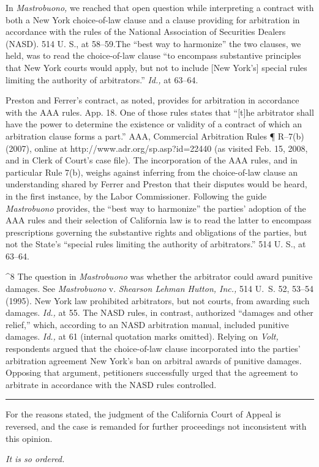   In \emph{Mastrobuono,} we reached that open question while interpreting
a contract with both a New York choice-of-law clause and a clause
providing for arbitration in accordance with the rules of the
National Association of Securities Dealers (NASD). 514 U. S., at
58--59.\footnotemark[8] The ``best way to harmonize'' the two clauses, we
held, was to read the choice-of-law clause ``to encompass substantive
principles that New York courts would apply, but not to include [New
York's] special rules limiting the authority of arbitrators.''
\emph{Id.,} at 63--64.

  Preston and Ferrer's contract, as noted, provides for arbitration
in accordance with the AAA rules. App. 18. One of those rules
states that ``[t]he arbitrator shall have the power to determine the
existence or validity of a contract of which an arbitration clause forms
a part.'' AAA, Commercial Arbitration Rules ¶ R--7(b) (2007),
online at http://www.adr.org/sp.asp?id=22440 (as visited Feb. 15, 2008,
and in Clerk of Court's case file). The incorporation of the AAA
rules, and in particular Rule 7(b), weighs against inferring from the
choice-of-law clause an understanding shared by Ferrer and Preston that
their disputes would be heard, in \newpage  the first instance, by the
Labor Commissioner. Following the guide \emph{Mastrobuono} provides, the
``best way to harmonize'' the parties' adoption of the AAA rules and
their selection of California law is to read the latter to encompass
prescriptions governing the substantive rights and obligations of the
parties, but not the State's ``special rules limiting the authority
of arbitrators.'' 514 U. S., at 63--64.

^8 The question in \emph{Mastrobuono} was whether the arbitrator could
award punitive damages. See \emph{Mastrobuono} v. \emph{Shearson Lehman
Hutton, Inc.,} 514 U.~S. 52, 53--54 (1995). New York law prohibited
arbitrators, but not courts, from awarding such damages. \emph{Id.,}
at 55. The NASD rules, in contrast, authorized ``damages and other
relief,'' which, according to an NASD arbitration manual, included
punitive damages. \emph{Id.,} at 61 (internal quotation marks omitted).
Relying on \emph{Volt,} respondents argued that the choice-of-law clause
incorporated into the parties' arbitration agreement New York's
ban on arbitral awards of punitive damages. Opposing that argument,
petitioners successfully urged that the agreement to arbitrate in
accordance with the NASD rules controlled.

\hrule

  For the reasons stated, the judgment of the California Court of Appeal
is reversed, and the case is remanded for further proceedings not
inconsistent with this opinion.

\begin{flushright}\emph{It is so ordered.}\end{flushright}
